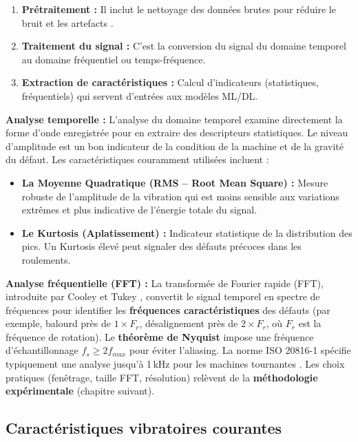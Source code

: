\begin{enumerate}
\item \textbf{Prétraitement :} Il inclut le nettoyage des données brutes pour réduire le bruit et les artefacts \cite{bagri2024}.
\item \textbf{Traitement du signal :} C'est la conversion du signal du domaine temporel au domaine fréquentiel ou temps-fréquence.
\item \textbf{Extraction de caractéristiques :} Calcul d'indicateurs (statistiques, fréquentiels) qui servent d'entrées aux modèles ML/DL.
\end{enumerate}

\textbf{Analyse temporelle :} L'analyse du domaine temporel examine directement la forme d'onde enregistrée pour en extraire des descripteurs statistiques. Le niveau d'amplitude est un bon indicateur de la condition de la machine et de la gravité du défaut. Les caractéristiques couramment utilisées incluent :
\begin{itemize}
\item \textbf{La Moyenne Quadratique (RMS -- Root Mean Square) :} Mesure robuste de l'amplitude de la vibration qui est moins sensible aux variations extrêmes et plus indicative de l'énergie totale du signal.
\item \textbf{Le Kurtosis (Aplatissement) :} Indicateur statistique de la distribution des pics. Un Kurtosis élevé peut signaler des défauts précoces dans les roulements.
\end{itemize}

\textbf{Analyse fréquentielle (FFT) :} La transformée de Fourier rapide (FFT), introduite par Cooley et Tukey \cite{cooley1965}, convertit le signal temporel en spectre de fréquences pour identifier les \textbf{fréquences caractéristiques} des défauts (par exemple, balourd près de $1 \times F_r$, désalignement près de $2 \times F_r$, où $F_r$ est la fréquence de rotation). Le \textbf{théorème de Nyquist} impose une fréquence d'échantillonnage $f_s \geq 2f_{max}$ pour éviter l'aliasing. La norme ISO 20816-1 spécifie typiquement une analyse jusqu'à 1\,kHz pour les machines tournantes \cite{iso20816-1}. Les choix pratiques (fenêtrage, taille FFT, résolution) relèvent de la \textbf{méthodologie expérimentale} (chapitre suivant).

\subsection{Caractéristiques vibratoires courantes}


